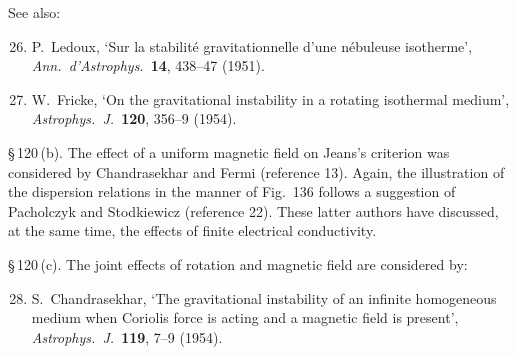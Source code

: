 See also:

\begin{enumerate}
\setcounter{enumi}{25}
\item P.\ Ledoux, `Sur la stabilit\'e gravitationnelle d'une n\'ebuleuse isotherme', \textit{Ann.\ d'Astrophys.}\ \textbf{14}, 438--47 (1951).
\item W.\ Fricke, `On the gravitational instability in a rotating isothermal medium', \textit{Astrophys.\ J.}\ \textbf{120}, 356--9 (1954).
\end{enumerate}

\S\,120\,(b). The effect of a uniform magnetic field on Jeans's criterion was considered by Chandrasekhar and Fermi (reference 13). Again, the illustration of the dispersion relations in the manner of Fig.~136 follows a suggestion of Pacholczyk and Stodkiewicz (reference 22). These latter authors have discussed, at the same time, the effects of finite electrical conductivity.

\S\,120\,(c). The joint effects of rotation and magnetic field are considered by:

\begin{enumerate}
\setcounter{enumi}{27}
\item S.\ Chandrasekhar, `The gravitational instability of an infinite homogeneous medium when Coriolis force is acting and a magnetic field is present', \textit{Astrophys.\ J.}\ \textbf{119}, 7--9 (1954).
\end{enumerate}
